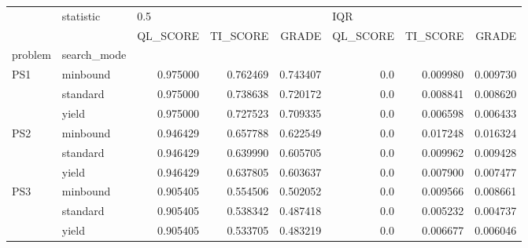 \begin{tabular}{llrrrrrr}
\toprule
    & statistic & \multicolumn{3}{l}{0.5} & \multicolumn{3}{l}{IQR} \\
    & {} &  QL\_SCORE &  TI\_SCORE &     GRADE & QL\_SCORE &  TI\_SCORE &     GRADE \\
problem & search\_mode &           &           &           &          &           &           \\
\midrule
PS1 & minbound &  0.975000 &  0.762469 &  0.743407 &      0.0 &  0.009980 &  0.009730 \\
    & standard &  0.975000 &  0.738638 &  0.720172 &      0.0 &  0.008841 &  0.008620 \\
    & yield &  0.975000 &  0.727523 &  0.709335 &      0.0 &  0.006598 &  0.006433 \\
PS2 & minbound &  0.946429 &  0.657788 &  0.622549 &      0.0 &  0.017248 &  0.016324 \\
    & standard &  0.946429 &  0.639990 &  0.605705 &      0.0 &  0.009962 &  0.009428 \\
    & yield &  0.946429 &  0.637805 &  0.603637 &      0.0 &  0.007900 &  0.007477 \\
PS3 & minbound &  0.905405 &  0.554506 &  0.502052 &      0.0 &  0.009566 &  0.008661 \\
    & standard &  0.905405 &  0.538342 &  0.487418 &      0.0 &  0.005232 &  0.004737 \\
    & yield &  0.905405 &  0.533705 &  0.483219 &      0.0 &  0.006677 &  0.006046 \\
\bottomrule
\end{tabular}
